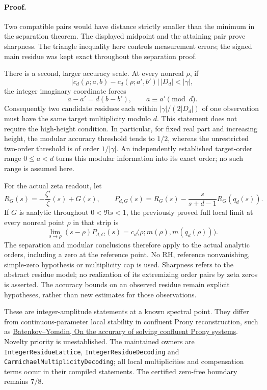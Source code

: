 \paragraph{Proof.}
Two compatible pairs would have distance strictly smaller than the
minimum in the separation theorem. The displayed
midpoint and the attaining pair prove sharpness. The triangle inequality
here controls measurement errors; the signed main residue was kept
exact throughout the separation proof.

There is a second, larger accuracy scale. At every nonreal \(\rho\), if
\[
 |c_d(\rho;a,b)-c_d(\rho;a',b')|\,|D_d|<|\gamma|,
\]
the integer imaginary coordinate forces
\[
 a-a'=d(b-b'),\qquad a\equiv a'\pmod d.
\]
Consequently two candidate residues each within
\(|\gamma|/(2|D_d|)\) of one observation must have the same target
multiplicity modulo \(d\). This statement does not require the
high-height condition. In particular, for fixed real part and increasing
height, the modular accuracy threshold tends to \(1/2\), whereas the
unrestricted two-order threshold is of order \(1/|\gamma|\).
An independently established target-order range \(0\le a<d\) turns this
modular information into its exact order; no such range is assumed here.

For the actual zeta readout, let
\[
 R_G(s)=-\frac{\zeta'}{\zeta}(s)+G(s),\qquad
 P_{d,G}(s)=R_G(s)-\frac{s}{s+d-1}R_G(q_d(s)).
\]
If \(G\) is analytic throughout \(0<\Re s<1\), the previously proved
full local limit at every nonreal point \(\rho\) in that strip is
\[
 \lim_{s\to\rho}(s-\rho)P_{d,G}(s)
 =c_d\bigl(\rho;m(\rho),m(q_d(\rho))\bigr).
\]
The separation and modular conclusions therefore apply to the actual
analytic orders, including a zero at the reference point. No RH,
reference nonvanishing, simple-zero hypothesis or multiplicity cap is
used. Sharpness refers to the abstract residue model; no realization
of its extremizing order pairs by zeta zeros is asserted. The accuracy
bounds on an observed residue remain explicit hypotheses, rather than
new estimates for those observations.

These are integer-amplitude statements at a known spectral point.
They differ from continuous-parameter local stability in confluent
Prony reconstruction, such as
\href{https://arxiv.org/abs/1106.1137}{Batenkov--Yomdin,
On the accuracy of solving confluent Prony systems}.
Novelty priority is unestablished.
The maintained owners are \texttt{IntegerResidueLattice},
\texttt{IntegerResidueDecoding} and
\texttt{CarmichaelMultiplicityDecoding}; all local multiplicities and
compensation terms occur in their compiled statements.
The certified zero-free boundary remains \(7/8\).

